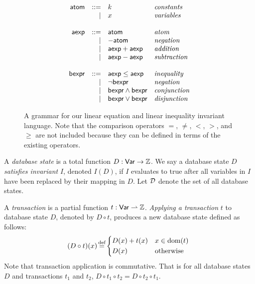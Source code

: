\begin{figure}[h]
  \centering

  \newcommand{\atom}{\textsf{atom}}
  \newcommand{\aexp}{\textsf{aexp}}
  \newcommand{\bexp}{\textsf{bexpr}}
  \begin{gather*}
    \begin{array}{rrll}
      \atom & ::= & k & \text{\emph{constants}} \\
            & |   & x & \text{\emph{variables}} \\
      &&& \\
      \aexp  & ::= & \atom         & \text{\emph{atom}} \\
             & |   & -\atom        & \text{\emph{negation}} \\
             & |   & \aexp + \aexp & \text{\emph{addition}} \\
             & |   & \aexp - \aexp & \text{\emph{subtraction}} \\
      &&& \\
      \bexp  & ::= & \aexp \leq \aexp  & \text{\emph{inequality}} \\
             & |   & \lnot \bexp       & \text{\emph{negation}} \\
             & |   & \bexp \land \bexp & \text{\emph{conjunction}} \\
             & |   & \bexp \lor \bexp  & \text{\emph{disjunction}} \\
    \end{array}
  \end{gather*}

  \caption{
    A grammar for our linear equation and linear inequality invariant language.
    Note that the comparison operators $=$, $\neq$, $<$, $>$, and $\geq$ are
    not included because they can be defined in terms of the existing
    operators.
  }
  \label{fig:invariant-grammar}
\end{figure}

A \emph{database state} is a total function $D: \textsf{Var} \to \mathbb{Z}$.  We say a
database state $D$ \emph{satisfies invariant} $I$, denoted $I(D)$, if $I$
evaluates to true after all variables in $I$ have been replaced by their
mapping in $D$. Let $\mathcal{D}$ denote the set of all database states.

A \emph{transaction} is a partial function $t: \textsf{Var} \rightharpoonup \mathbb{Z}$.
\emph{Applying a transaction} $t$ to database state $D$, denoted by $D \circ
t$, produces a new database state defined as follows:
\[
  (D \circ t)(x) \defeq \begin{cases*}
    D(x) + t(x) & $x \in \dom{}(t)$ \\
    D(x)        & otherwise
  \end{cases*}
\]
Note that transaction application is commutative. That is for all database
states $D$ and transactions $t_1$ and $t_2$, $D \circ t_1 \circ t_2 = D \circ
t_2 \circ t_1$.

